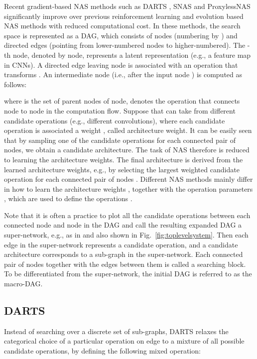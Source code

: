\documentclass{article}
\newcommand{\figref}{Fig.~\ref}
\begin{document}
Recent gradient-based NAS methods such as DARTS \cite{liu2018darts}, SNAS \cite{xie2018snas} and ProxylessNAS \cite{cai2018proxelessnas} significantly improve over previous reinforcement learning and evolution based NAS methods with reduced computational cost.
In these methods, the search space is represented as a DAG, which consists of nodes (numbering by ) and directed edges (pointing from lower-numbered nodes to higher-numbered). The -th node, denoted by node, represents a latent representation  (e.g., a feature map in CNNs). A directed edge leaving node is associated with an operation that transforms . An intermediate node (i.e., after the input node ) is computed as follows:

where  is the set of parent nodes of node,  denotes the operation that connects node to node in the computation flow.
Suppose that  can take from  different candidate operations  (e.g., different convolutions), where each candidate operation is associated a weight , called architecture weight.
It can be easily seen that by sampling one of the  candidate operations for each connected pair of nodes, we obtain a candidate architecture.
The task of NAS therefore is reduced to learning the architecture weights. The final architecture is derived from the learned architecture weights, e.g., by selecting the largest weighted candidate operation for each connected pair of nodes .
Different NAS methods mainly differ in how to learn the architecture weights , together with the operation parameters , which are used to define the operations .

Note that it is often a practice to plot all the candidate operations  between each connected node and node in the DAG and call the resulting expanded DAG a super-network, e.g., as in \cite{liu2018darts,xie2018snas,cai2018proxelessnas} and also shown in \figref{fig:toplevelsystem}.
Then each edge in the super-network represents a candidate operation, and a candidate architecture corresponds to a sub-graph in the super-network.
Each connected pair of nodes together with the  edges between them is called a searching block.
To be differentiated from the super-network, the initial DAG is referred to as the macro-DAG.

\subsection{DARTS}
\label{sec:relatedwork:DARTS}

Instead of searching over a discrete set of sub-graphs, DARTS relaxes the categorical choice of a particular operation  on edge  to a mixture of all possible  candidate operations, by defining the following mixed operation:
\end{document}
